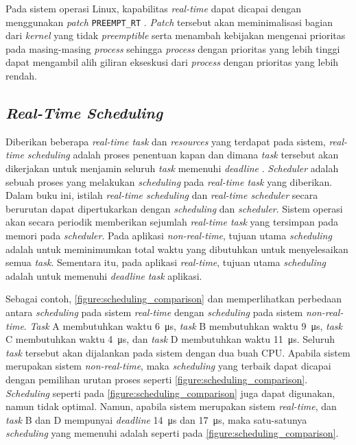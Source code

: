 Pada sistem operasi Linux, kapabilitas \textit{real-time} dapat dicapai dengan menggunakan
\textit{patch} \texttt{PREEMPT\_RT} \citep{RTLinux}. \textit{Patch} tersebut akan meminimalisasi
bagian dari \textit{kernel} yang tidak \textit{preemptible} serta menambah kebijakan mengenai
prioritas pada masing-masing \textit{process} sehingga \textit{process} dengan prioritas yang
lebih tinggi dapat mengambil alih giliran ekseskusi dari \textit{process} dengan prioritas yang
lebih rendah.

\subsection{\textit{Real-Time Scheduling}}

Diberikan beberapa \textit{real-time task} dan \textit{resources} yang terdapat pada sistem,
\textit{real-time scheduling} adalah proses penentuan kapan dan dimana \textit{task} tersebut
akan dikerjakan untuk menjamin seluruh \textit{task} memenuhi \textit{deadline}
\citep[pp.~8-9]{Shin1994}.  \textit{Scheduler} adalah sebuah proses yang melakukan
\textit{scheduling} pada \textit{real-time task} yang diberikan.  Dalam buku ini, istilah
\textit{real-time scheduling} dan \textit{real-time scheduler} secara berurutan dapat
dipertukarkan dengan \textit{scheduling} dan \textit{scheduler}.  Sistem operasi akan secara
periodik memberikan sejumlah \textit{real-time task} yang tersimpan pada memori pada
\textit{scheduler}.  Pada aplikasi \textit{non-real-time}, tujuan utama \textit{scheduling}
adalah untuk meminimumkan total waktu yang dibutuhkan untuk menyelesaikan semua \textit{task}.
Sementara itu, pada aplikasi \textit{real-time}, tujuan utama \textit{scheduling} adalah untuk
memenuhi \textit{deadline} \textit{task} aplikasi.

Sebagai contoh, \autoref{figure:scheduling_comparison}
dan  memperlihatkan perbedaan antara
\textit{scheduling} pada sistem \textit{real-time} dengan \textit{scheduling} pada sistem
\textit{non-real-time}.  \textit{Task} A membutuhkan waktu \SI{6}{\micro\second}, \textit{task}
B membutuhkan waktu \SI{9}{\micro\second}, \textit{task} C membutuhkan waktu
\SI{4}{\micro\second}, dan \textit{task} D membutuhkan waktu \SI{11}{\micro\second}.  Seluruh
\textit{task} tersebut akan dijalankan pada sistem dengan dua buah CPU.  Apabila sistem
merupakan sistem \textit{non-real-time}, maka \textit{scheduling} yang terbaik dapat dicapai
dengan pemilihan urutan proses seperti
\autoref{figure:scheduling_comparison}.
\textit{Scheduling} seperti pada
\autoref{figure:scheduling_comparison} juga dapat
digunakan, namun tidak optimal.  Namun, apabila sistem merupakan sistem \textit{real-time}, dan
\textit{task} B dan D mempunyai \textit{deadline} \SI{14}{\micro\second} dan
\SI{17}{\micro\second}, maka satu-satunya \textit{scheduling} yang memenuhi adalah seperti pada
\autoref{figure:scheduling_comparison}.

